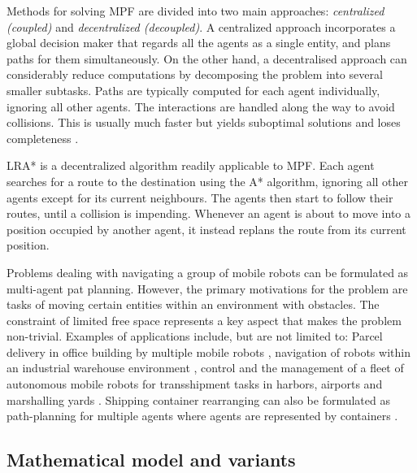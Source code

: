 Methods for solving MPF are divided into two main approaches: \emph{centralized (coupled)} and \emph{decentralized (decoupled)}.
A centralized approach incorporates a global decision maker that regards all the agents as a single entity, and plans paths for them simultaneously.
On the other hand, a decentralised approach can considerably reduce computations by decomposing the problem into several smaller subtasks.
Paths are typically computed for each agent individually, ignoring all other agents.
The interactions are handled along the way to avoid collisions.
This is usually much faster but yields suboptimal solutions and loses completeness \cite{ryan08}.

LRA* \cite{silver05} is a decentralized algorithm readily applicable to MPF.
Each  agent searches for a route to the destination using the A* algorithm, ignoring all other agents except for its current neighbours. 
The agents then start to follow their routes, until a collision is impending.  
Whenever an agent is about to move into a position occupied by another agent, it instead replans the route from its current position.

Problems dealing with navigating a group of mobile robots can be formulated as multi-agent pat planning.  
However, the primary motivations for the problem are tasks of moving certain entities within an environment with obstacles.
The constraint of limited free space represents a key aspect that makes the problem non-trivial. 
Examples of applications include, but are not limited to: 
Parcel delivery in office building by multiple mobile robots \cite{hada01},
navigation of robots within an industrial warehouse environment \cite{everett95},
control and the management of a fleet of autonomous mobile robots for transshipment tasks in harbors, airports and marshalling yards \cite{alami98}.
Shipping container rearranging can also be formulated as path-planning for multiple agents where agents are represented by containers \cite{surynek11}.

\subsection{Mathematical model and variants}\label{sect:modvar}

